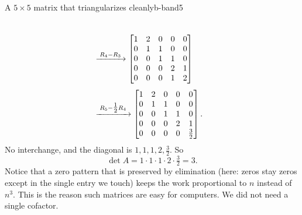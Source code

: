 \documentclass[11pt]{article}
\begin{document}
\begin{exmp}{A $5\times5$ matrix that triangularizes cleanly}{b-band5}
\begin{align*}
\\[4pt]
&\xrightarrow{\;R_4-R_3\;}
\begin{bmatrix}1&2&0&0&0\\0&1&1&0&0\\0&0&1&1&0\\0&0&0&2&1\\0&0&0&1&2\end{bmatrix}
\\[4pt]
&\xrightarrow{\;R_5-\tfrac12R_4\;}
\begin{bmatrix}1&2&0&0&0\\0&1&1&0&0\\0&0&1&1&0\\0&0&0&2&1\\0&0&0&0&\tfrac32\end{bmatrix}
.
\end{align*}
No interchange, and the diagonal is $1,1,1,2,\tfrac32$. So
\[
\det A=1\cdot1\cdot1\cdot2\cdot\tfrac32=3.
\]
Notice that a zero pattern that is preserved by elimination (here: zeros stay zeros except in the single entry we touch) keeps the work proportional to $n$ instead of $n^3$. This is the reason such matrices are easy for computers. We did not need a single cofactor.
\end{exmp}
\end{document}
